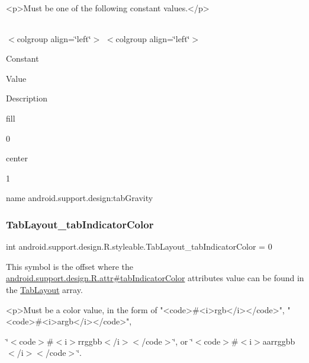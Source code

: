\begin{DoxyVerb}      <p>Must be one of the following constant values.</p>
\end{DoxyVerb}
 \tabulinesep=1mm
\begin{longtabu} spread 0pt [c]{*{0}{|X[-1]}|}
\hline
\end{longtabu}
$<$colgroup align=\char`\"{}left\char`\"{}$>$ $<$colgroup align=\char`\"{}left\char`\"{}$>$ 

Constant

Value

Description 

{\ttfamily fill}

0

{\ttfamily center}

1

name android.\+support.\+design\+:tab\+Gravity \mbox{\label{classandroid_1_1support_1_1design_1_1R_1_1styleable_a8dfd23af824aaddd41960c0c43bae554}} 
\subsubsection{\texorpdfstring{Tab\+Layout\+\_\+tab\+Indicator\+Color}{TabLayout\_tabIndicatorColor}}
{\footnotesize\ttfamily int android.\+support.\+design.\+R.\+styleable.\+Tab\+Layout\+\_\+tab\+Indicator\+Color = 0\hspace{0.3cm}{\ttfamily [static]}}

This symbol is the offset where the \hyperlink{classandroid_1_1support_1_1design_1_1R_1_1attr_a5834056dea54e9c078fdc6ac6b59f3b9}{android.\+support.\+design.\+R.\+attr\#tab\+Indicator\+Color} attribute\textquotesingle{}s value can be found in the \hyperlink{classandroid_1_1support_1_1design_1_1R_1_1styleable_a514b47b47f600f9421b65f4f0aa832d6}{Tab\+Layout} array.

\begin{DoxyVerb}      <p>Must be a color value, in the form of "<code>#<i>rgb</i></code>", "<code>#<i>argb</i></code>",
\end{DoxyVerb}
 \char`\"{}$<$code$>$\#$<$i$>$rrggbb$<$/i$>$$<$/code$>$\char`\"{}, or \char`\"{}$<$code$>$\#$<$i$>$aarrggbb$<$/i$>$$<$/code$>$\char`\"{}. 

